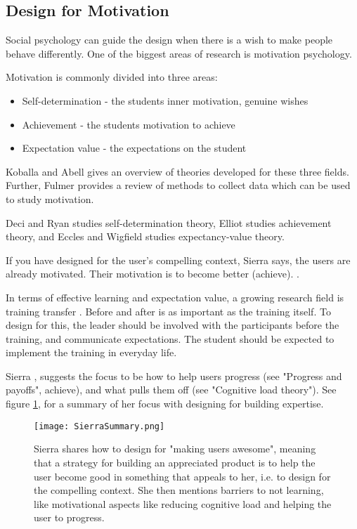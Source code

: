 \subsection{Design for Motivation}

Social psychology can guide the design when there is a wish to make people behave differently. One of the biggest areas of research is motivation psychology.

Motivation is commonly divided into three areas:
\begin{itemize}
\item Self-determination - the students inner motivation, genuine wishes
\item Achievement - the students motivation to achieve
\item Expectation value - the expectations on the student
\end{itemize}

Koballa \citep{koballa} and Abell \citep{abell} gives an overview of theories developed for these three fields. Further, Fulmer \citep{fulmer} provides a review of methods to collect data which can be used to study motivation.

Deci \citep{deci} and Ryan \citep{ryan} studies self-determination theory, Elliot \citep{elliot} studies achievement theory, and Eccles \citep{eccles} and Wigfield \citep{wigfield} studies expectancy-value theory.

If you have designed for the user's compelling context, Sierra says, the users are already motivated. Their motivation is to become better (achieve). \citep{sierra}.

In terms of effective learning and expectation value, a growing research field is training transfer \citep{brinkerhoff}. Before and after is as important as the training itself. To design for this, the leader should be involved with the participants before the training, and communicate expectations. The student should be expected to implement the training in everyday life. \citep{brinkerhoff}

Sierra \citep{sierra}, suggests the focus to be how to help users progress (see "Progress and payoffs", achieve), and what pulls them off (see "Cognitive load theory"). See figure \ref{fig:sierra-summary}, for a summary of her focus with designing for building expertise.

\begin{figure}[h]
  \centering
  \texttt{[image: SierraSummary.png]}
  \caption{Sierra shares how to design for "making users awesome", meaning that a strategy for building an appreciated product is to help the user become good in something that appeals to her, i.e. to design for the compelling context. She then mentions barriers to not learning, like motivational aspects like reducing cognitive load and helping the user to progress.}
  \label{fig:sierra-summary}
\end{figure}

